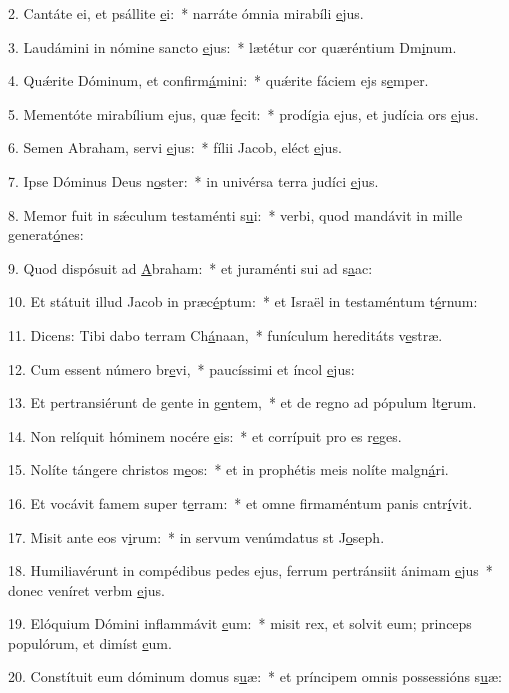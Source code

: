 2. Cantáte ei, et psállite \uline{e}i:~* narráte ómnia mirabíli \uline{e}jus.\par 
3. Laudámini in nómine sancto \uline{e}jus:~* lætétur cor quæréntium Dm\uline{i}num.\par 
4. Quǽrite Dóminum, et confirm\uline{á}mini:~* quǽrite fáciem ejs s\uline{e}mper.\par 
5. Mementóte mirabílium ejus, quæ f\uline{e}cit:~* prodígia ejus, et judícia ors \uline{e}jus.\par 
6. Semen Abraham, servi \uline{e}jus:~* fílii Jacob, eléct \uline{e}jus.\par 
7. Ipse Dóminus Deus n\uline{o}ster:~* in univérsa terra judíci \uline{e}jus.\par 
8. Memor fuit in sǽculum testaménti s\uline{u}i:~* verbi, quod mandávit in mille generat\uline{ó}nes:\par 
9. Quod dispósuit ad \uline{A}braham:~* et juraménti sui ad s\uline{a}ac:\par 
10. Et státuit illud Jacob in præc\uline{é}ptum:~* et Israël in testaméntum t\uline{é}rnum:\par 
11. Dicens: Tibi dabo terram Ch\uline{á}naan,~* funículum hereditáts v\uline{e}stræ.\par 
12. Cum essent número br\uline{e}vi,~* paucíssimi et íncol \uline{e}jus:\par 
13. Et pertransiérunt de gente in g\uline{e}ntem,~* et de regno ad pópulum lt\uline{e}rum.\par 
14. Non relíquit hóminem nocére \uline{e}is:~* et corrípuit pro es r\uline{e}ges.\par 
15. Nolíte tángere christos m\uline{e}os:~* et in prophétis meis nolíte malgn\uline{á}ri.\par 
16. Et vocávit famem super t\uline{e}rram:~* et omne firmaméntum panis cntr\uline{í}vit.\par 
17. Misit ante eos v\uline{i}rum:~* in servum venúmdatus st J\uline{o}seph.\par 
18. Humiliavérunt in compédibus pedes ejus, ferrum pertránsiit ánimam \uline{e}jus~* donec veníret verbm \uline{e}jus.\par 
19. Elóquium Dómini inflammávit \uline{e}um:~* misit rex, et solvit eum; princeps populórum, et dimíst \uline{e}um.\par 
20. Constítuit eum dóminum domus s\uline{u}æ:~* et príncipem omnis possessións s\uline{u}æ:\par 
